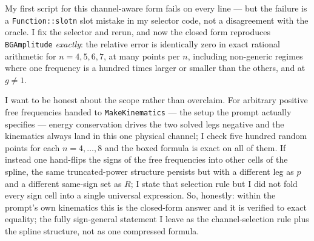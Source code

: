 \documentclass{article}
\begin{document}
My first script for this channel-aware form fails on every line --- but the
failure is a \texttt{Function::slotn} slot mistake in my selector code, not a
disagreement with the oracle. I fix the selector and rerun, and now the closed
form reproduces \texttt{BGAmplitude} \emph{exactly}: the relative error is
identically zero in exact rational arithmetic for $n=4,5,6,7$, at many points per
$n$, including non-generic regimes where one frequency is a hundred times larger
or smaller than the others, and at $g\ne1$.

I want to be honest about the scope rather than overclaim. For arbitrary positive
free frequencies handed to \texttt{MakeKinematics} --- the setup the prompt
actually specifies --- energy conservation drives the two solved legs negative
and the kinematics always land in this one physical channel; I check five hundred
random points for each $n=4,\dots,8$ and the boxed formula is exact on all of
them. If instead one hand-flips the signs of the free frequencies into other
cells of the spline, the same truncated-power structure persists but with a
different leg as $p$ and a different same-sign set as $R$; I state that selection
rule but I did not fold every sign cell into a single universal expression. So,
honestly: within the prompt's own kinematics this is the closed-form answer and
it is verified to exact equality; the fully sign-general statement I leave as the
channel-selection rule plus the spline structure, not as one compressed formula.




\end{document}
